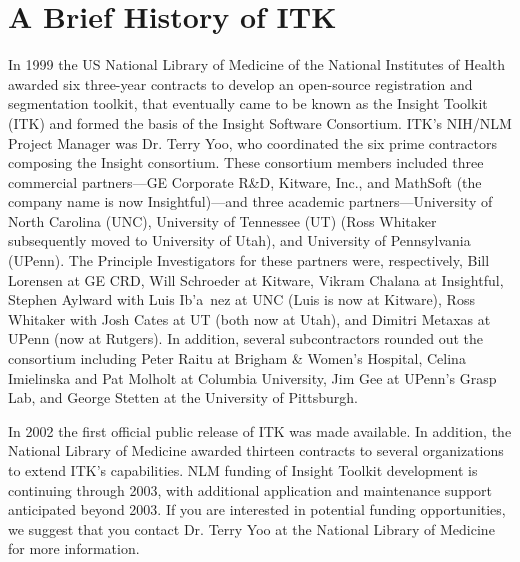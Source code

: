 \section{A Brief History of ITK}
\label{sec:History}

In 1999 the US National Library of Medicine of the National Institutes of
Health awarded six three-year contracts to develop an open-source
registration and segmentation toolkit, that eventually came to be known as
the Insight Toolkit (ITK) and formed the basis of the Insight Software
Consortium. ITK's NIH/NLM Project Manager was Dr. Terry Yoo, who coordinated the
six prime contractors composing the Insight consortium. These consortium
members included three commercial partners---GE Corporate R\&D, Kitware,
Inc., and MathSoft (the company name is now Insightful)---and three academic
partners---University of North Carolina (UNC), University of Tennessee (UT)
(Ross Whitaker subsequently moved to University of Utah), and University of
Pennsylvania (UPenn). The Principle Investigators for these partners were,
respectively, Bill Lorensen at GE CRD, Will Schroeder at Kitware, Vikram
Chalana at Insightful, Stephen Aylward with Luis Ib'{a}~{n}ez at UNC (Luis is now
at Kitware), Ross Whitaker with Josh Cates at UT (both now at Utah), and
Dimitri Metaxas at UPenn (now at Rutgers). In addition, several
subcontractors rounded out the consortium including Peter Raitu at Brigham \&
Women's Hospital, Celina Imielinska and Pat Molholt at Columbia University,
Jim Gee at UPenn's Grasp Lab, and George Stetten at the University of
Pittsburgh.

In 2002 the first official public release of ITK was made available. In
addition, the National Library of Medicine awarded thirteen contracts to
several organizations to extend ITK's capabilities. NLM funding of
Insight Toolkit development is continuing through 2003, with additional
application and maintenance support anticipated beyond 2003. If you are
interested in potential funding opportunities, we suggest that you contact
Dr. Terry Yoo at the National Library of Medicine for more information.
